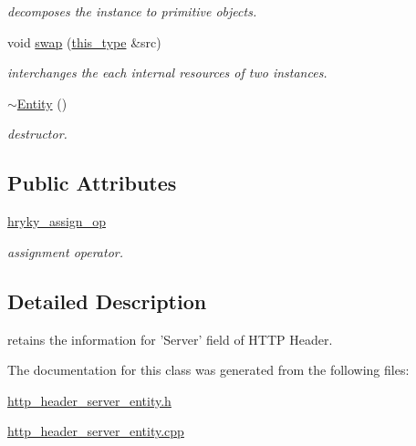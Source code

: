 \begin{DoxyCompactItemize}
\begin{DoxyCompactList}\small\item\em decomposes the instance to primitive objects. \end{DoxyCompactList}\item 
\hypertarget{classhryky_1_1http_1_1header_1_1server_1_1_entity_a5fbfaea5f91a18a6a0488ec7bacca444}{void \hyperlink{classhryky_1_1http_1_1header_1_1server_1_1_entity_a5fbfaea5f91a18a6a0488ec7bacca444}{swap} (\hyperlink{classhryky_1_1http_1_1header_1_1server_1_1_entity_a0009d4111326ee03ac700834367f90fa}{this\-\_\-type} \&src)}\label{classhryky_1_1http_1_1header_1_1server_1_1_entity_a5fbfaea5f91a18a6a0488ec7bacca444}

\begin{DoxyCompactList}\small\item\em interchanges the each internal resources of two instances. \end{DoxyCompactList}\item 
\hypertarget{classhryky_1_1http_1_1header_1_1server_1_1_entity_a3e1a2f75a58396f41c80fbe9d005d892}{\hyperlink{classhryky_1_1http_1_1header_1_1server_1_1_entity_a3e1a2f75a58396f41c80fbe9d005d892}{$\sim$\-Entity} ()}\label{classhryky_1_1http_1_1header_1_1server_1_1_entity_a3e1a2f75a58396f41c80fbe9d005d892}

\begin{DoxyCompactList}\small\item\em destructor. \end{DoxyCompactList}\end{DoxyCompactItemize}
\subsection*{Public Attributes}
\begin{DoxyCompactItemize}
\item 
\hypertarget{classhryky_1_1http_1_1header_1_1server_1_1_entity_a07f1acf2cc0e2b941c4762ad467b7ce1}{\hyperlink{classhryky_1_1http_1_1header_1_1server_1_1_entity_a07f1acf2cc0e2b941c4762ad467b7ce1}{hryky\-\_\-assign\-\_\-op}}\label{classhryky_1_1http_1_1header_1_1server_1_1_entity_a07f1acf2cc0e2b941c4762ad467b7ce1}

\begin{DoxyCompactList}\small\item\em assignment operator. \end{DoxyCompactList}\end{DoxyCompactItemize}


\subsection{Detailed Description}
retains the information for 'Server' field of H\-T\-T\-P Header. 

The documentation for this class was generated from the following files\-:\begin{DoxyCompactItemize}
\item 
\hyperlink{http__header__server__entity_8h}{http\-\_\-header\-\_\-server\-\_\-entity.\-h}\item 
\hyperlink{http__header__server__entity_8cpp}{http\-\_\-header\-\_\-server\-\_\-entity.\-cpp}\end{DoxyCompactItemize}
